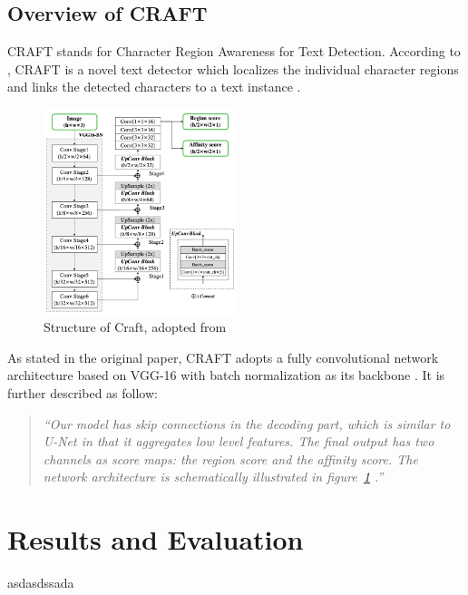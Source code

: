 \documentclass[10pt, a4paper]{article}
\begin{document}
\clearpage

\subsection{Overview of CRAFT} %
\label{sub:overviewcraft}
CRAFT stands for Character Region Awareness for Text Detection. According to \cite{CraftBaekEtAl}, CRAFT is a novel text detector which localizes the individual character regions and links the detected characters to a text instance \citep{CraftBaekEtAl}.
\begin{figure}[h!]
	\centering
	\includegraphics[width=0.5\textwidth]{img/craftstructure.png}
	\caption{Structure of Craft, adopted from~\protect\cite{CraftBaekEtAl}}
	\label{fig:craft1}
\end{figure}

As stated in the original paper, CRAFT adopts a fully convolutional network architecture based on VGG-16 \citep{vgg} with batch normalization as its backbone \citep{CraftBaekEtAl}.
It is further described as follow:
\begin{quotation}
	\emph{``Our model has skip connections in the decoding part, which is similar to U-Net \citep{unet} in that it aggregates low level features. The final output has two channels as score maps: the region score and the affinity score.
	The network architecture is schematically illustrated in figure~\ref{fig:craft1} \citep{CraftBaekEtAl}.''}
\end{quotation}

\section{Results and Evaluation} %
\label{sec:evaluation}
asdasdssada
\end{document}
